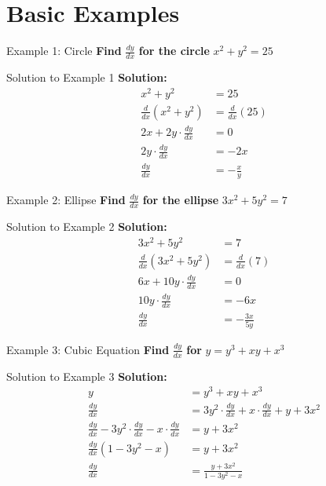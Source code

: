 \documentclass[aspectratio=169]{beamer}
\begin{document}
\section{Basic Examples}

\begin{frame}{Example 1: Circle}
\textbf{Find } $\frac{dy}{dx}$ \textbf{ for the circle } $x^2 + y^2 = 25$
\end{frame}

\begin{frame}{Solution to Example 1}
\textbf{Solution:}
\[
\begin{aligned}
  x^2 + y^2 &= 25 \\
  \frac{d}{dx}(x^2 + y^2) &= \frac{d}{dx}(25) \\
  2x + 2y \cdot \frac{dy}{dx} &= 0 \\
  2y \cdot \frac{dy}{dx} &= -2x \\
  \frac{dy}{dx} &= -\frac{x}{y}
\end{aligned}
\]
\end{frame}

\begin{frame}{Example 2: Ellipse}
\textbf{Find } $\frac{dy}{dx}$ \textbf{ for the ellipse } $3x^2 + 5y^2 = 7$
\end{frame}

\begin{frame}{Solution to Example 2}
\textbf{Solution:}
\[
\begin{aligned}
  3x^2 + 5y^2 &= 7 \\
  \frac{d}{dx}(3x^2 + 5y^2) &= \frac{d}{dx}(7) \\
  6x + 10y \cdot \frac{dy}{dx} &= 0 \\
  10y \cdot \frac{dy}{dx} &= -6x \\
  \frac{dy}{dx} &= -\frac{3x}{5y}
\end{aligned}
\]
\end{frame}

\begin{frame}{Example 3: Cubic Equation}
\textbf{Find } $\frac{dy}{dx}$ \textbf{ for } $y = y^3 + xy + x^3$
\end{frame}

\begin{frame}{Solution to Example 3}
\textbf{Solution:}
\[
\begin{aligned}
  y &= y^3 + xy + x^3 \\
  \frac{dy}{dx} &= 3y^2 \cdot \frac{dy}{dx} + x \cdot \frac{dy}{dx} + y + 3x^2 \\
  \frac{dy}{dx} - 3y^2 \cdot \frac{dy}{dx} - x \cdot \frac{dy}{dx} &= y + 3x^2 \\
  \frac{dy}{dx}(1 - 3y^2 - x) &= y + 3x^2 \\
  \frac{dy}{dx} &= \frac{y + 3x^2}{1 - 3y^2 - x}
\end{aligned}
\]
\end{frame}
\end{document}
